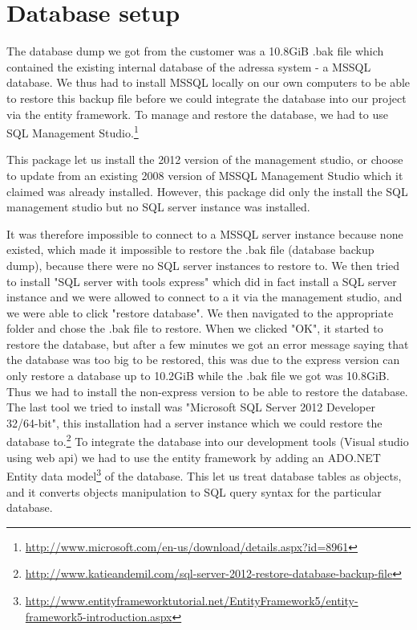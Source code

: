 \chapter{Database setup}\label{dbSetup}
The database dump we got from the customer was a 10.8GiB .bak file which contained the existing internal database of the adressa system - a MSSQL database.
We thus had to install MSSQL locally on our own computers to be able to restore this backup file before we could integrate the database into our project via the entity framework. To manage and restore the database, we had to use SQL Management Studio.\footnote{\href{http://www.microsoft.com/en-us/download/details.aspx?id=8961}{http://www.microsoft.com/en-us/download/details.aspx?id=8961}}

This package let us install the 2012 version of the management studio, or choose to update from an existing 2008 version of MSSQL Management Studio which it claimed was already installed. However, this package did only the install the SQL management studio but no SQL server instance was installed.

It was therefore impossible to connect to a MSSQL server instance because none existed, which made it impossible to restore the .bak file (database backup dump), because there were no SQL server instances to restore to.
We then tried to install "SQL server with tools express" which did in fact install a SQL server instance and we were allowed to connect to a it via the management studio, and we were able to click "restore database". We then navigated to the appropriate folder and chose the .bak file to restore. When we clicked "OK", it started to restore the database, but after a few minutes we got an error message saying that the database was too big to be restored, this was due to the express version can only restore a database up to 10.2GiB while the .bak file we got was 10.8GiB. Thus we had to install the non-express version to be able to restore the database. The last tool we tried to install was "Microsoft SQL Server 2012 Developer 32/64-bit", this installation had a server instance which we could restore the database to.\footnote{\href{http://www.katieandemil.com/sql-server-2012-restore-database-backup-file}{http://www.katieandemil.com/sql-server-2012-restore-database-backup-file}}
To integrate the database into our development tools (Visual studio using web api) we had to use the entity framework by adding an ADO.NET Entity data model\footnote{\href{http://www.entityframeworktutorial.net/EntityFramework5/entity-framework5-introduction.aspx}{http://www.entityframeworktutorial.net/EntityFramework5/entity-framework5-introduction.aspx}} of the database.
This let us treat database tables as objects, and it converts objects manipulation to SQL query syntax for the particular database.